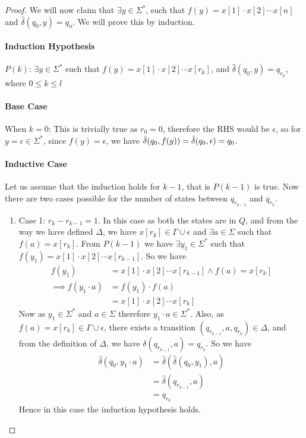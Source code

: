 \begin{soln}
\begin{proof}
		We will now claim that $\exists y \in \Sigma^*$, such that $f(y)=x[1] \cdot x[2] \cdots x[n]$ and $\hat\delta(q_0,y)=q_n$.  We will prove this by induction.

		\paragraph{Induction Hypothesis} $P(k)$: $\exists y \in \Sigma^*$ such that $f(y)=x[1] \cdot x[2] \cdots x[r_k]$, and $\hat\delta(q_0,y)=q_{r_k}$, where $0\leq k\leq l$

        \paragraph{Base Case} When $k=0$: This is trivially true as $r_0=0$, therefore the RHS would be $\epsilon$, so for $y=\epsilon \in \Sigma^*$, since $f(y)=\epsilon$, we have $\hat{\delta}(q_0, f(y)) = \hat{\delta}(q_0,
        \epsilon) = q_0$.

		\paragraph{Inductive Case} Let us assume that the induction holds for $k-1$, that is $P(k-1)$ is true. Now there are two cases possible for the number of states between $q_{r_{k-1}}$ and
        $q_{r_{k}}$.

		\begin{enumerate}
			\item
			      Case 1: $r_{k} - r_{k-1} = 1$. In this case as both the states are in $Q$, and from the way we have defined $\Delta$, we have $x[r_k] \in \Gamma \cup \epsilon$ and $\exists a \in
                  \Sigma$ such that $f(a)=x[r_k]$. From $P(k-1)$ we have $\exists y_1 \in \Sigma^*$ such that $f(y_1) = x[1] \cdot x[2] \cdots x[r_{k-1}]$. So we have
			      \begin{align*}
                      f(y_1) &= x[1] \cdot x[2] \cdots x[r_{k-1}] \land f(a) = x[r_k]\\
				      \implies f(y_1\cdot a) &= f(y_1) \cdot f(a) \\
				                        & =x[1] \cdot x[2] \cdots x[r_{k}]
			      \end{align*}
			      Now as $y_1 \in \Sigma^*$ and $a \in \Sigma$ therefore $y_1\cdot a \in \Sigma^*$. Also, as $f(a)=x[r_k] \in \Gamma \cup \epsilon$, there exists a transition $(q_{r_{k-1}},a,q_{r_k})
                  \in \Delta$, and from the definition of $\Delta$, we have $\delta(q_{r_{k-1}}, a) = q_{r_k}$. So we have
			      \begin{align*}
				      \hat\delta(q_0,y_1\cdot a) & =\hat\delta(\hat\delta(q_0,y_1),a) \\
				                                & =\hat\delta(q_{r_{k-1}},a)         \\
				                                & =q_{r_k}
			      \end{align*}
			      Hence in this case the induction hypothesis holds.


\end{enumerate}
\end{proof}
\end{soln}

